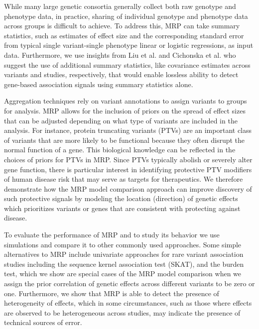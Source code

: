While many large genetic consortia generally collect both raw genotype and phenotype data, in practice, sharing of individual genotype and phenotype data across groups is difficult to achieve. To address this, MRP can take summary statistics, such as estimates of effect size and the corresponding standard error from typical single variant-single phenotype linear or logistic regressions, as input data. Furthermore, we use insights from Liu et al.\cite{liu2014meta} and Cichonska et al.\cite{cichonska2016metacca} who suggest the use of additional summary statistics, like covariance estimates across variants and studies, respectively, that would enable lossless ability to detect gene-based association signals using summary statistics alone.  

Aggregation techniques rely on variant annotations to assign variants to groups for analysis. MRP allows for the inclusion of priors on the spread of effect sizes that can be adjusted depending on what type of variants are included in the analysis. For instance, protein truncating variants (PTVs)\cite{rivas2013assessing,rivas2015effect} are an important class of variants that are more likely to be functional because they often disrupt the normal function of a gene. This biological knowledge can be reflected in the choices of priors for PTVs in MRP. Since PTVs typically abolish or severely alter gene function, there is particular interest in identifying protective PTV modifiers of human disease risk that may serve as targets for therapeutics\cite{pcsk9,cohen2006sequence,sullivan2012effect}. We therefore demonstrate how the MRP model comparison approach can improve discovery of such protective signals by modeling the location (direction) of genetic effects which prioritizes variants or genes that are consistent with protecting against disease. 

To evaluate the performance of MRP and to study its behavior we use simulations and compare it to other commonly used approaches. Some simple alternatives to MRP include univariate approaches for rare variant association studies including the sequence kernel association test (SKAT)\cite{skat}, and the burden test, which we show are special cases of the MRP model comparison when we assign the prior correlation of genetic effects across different variants to be zero or one. Furthermore, we show that MRP is able to detect the presence of heterogeneity of effects, which in some circumstances, such as those where effects are observed to be heterogeneous across studies, may indicate the presence of technical sources of error. 
  
